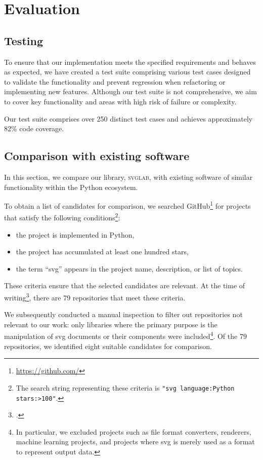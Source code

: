 \chapter{Evaluation}\label{chap:evaluation}

\section{Testing}

To ensure that our implementation meets the specified requirements and behaves as expected, we have created a test suite comprising various test cases designed to validate the functionality and prevent regression when refactoring or implementing new features. Although our test suite is not comprehensive, we aim to cover key functionality and areas with high risk of failure or complexity.

Our test suite comprises over 250 distinct test cases and achieves approximately 82\% code coverage.

\section{Comparison with existing software}\label{sec:other-libs}

In this section, we compare our library, \textsc{svglab}, with existing software of similar functionality within the Python ecosystem.

To obtain a list of candidates for comparison, we searched GitHub\footnote{\url{https://github.com/}} for projects that satisfy the following conditions\footnote{The search string representing these criteria is \texttt{"svg language:Python stars:>100"}.}:
\begin{itemize}
    \item the project is implemented in Python,
    \item the project has accumulated at least one hundred stars,
    \item the term \enquote{svg} appears in the project name, description, or list of topics.
\end{itemize}

These criteria ensure that the selected candidates are relevant. At the time of writing\footnote{.}, there are 79 repositories that meet these criteria.

We subsequently conducted a manual inspection to filter out repositories not relevant to our work: only libraries where the primary purpose is the manipulation of \gls{svg} documents or their components were included\footnote{In particular, we excluded projects such as file format converters, renderers, machine learning projects, and projects where \gls{svg} is merely used as a format to represent output data.}. Of the 79 repositories, we identified eight suitable candidates for comparison.

